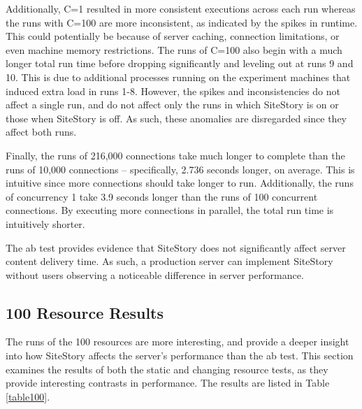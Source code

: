 \documentclass[runningheads,a4paper]{llncs}
\begin{document}
Additionally, C=1 resulted in more consistent executions across each run whereas the runs with C=100 are more inconsistent, as indicated by the spikes in runtime. This could potentially be because of server caching, connection limitations, or even machine memory restrictions. The runs of C=100 also begin with a much longer total run time before dropping significantly and leveling out at runs 9 and 10. 
This is due to additional processes running on the experiment machines that induced extra load in runs 1-8. However, the spikes and inconsistencies do not affect a single run, and do not affect only the runs in which SiteStory is on or those when SiteStory is off. As such, these anomalies are disregarded since they affect both runs.

Finally, the runs of 216,000 connections take much longer to complete than the runs of 10,000 connections -- specifically, 2.736 seconds longer, on average. This is intuitive since more connections should take longer to run. Additionally, the runs of concurrency 1 take 3.9 seconds longer than the runs of 100 concurrent connections. By executing more connections in parallel, the total run time is intuitively shorter. 

The ab test provides evidence that SiteStory does not significantly affect server content delivery time. As such, a production server can implement SiteStory without users observing a noticeable difference in server performance. 

\subsection{100 Resource Results}
\label{staticresults}
\vskip -3mm
The runs of the 100 resources are more interesting, and provide a deeper insight into how SiteStory affects the server's performance than the ab test. This section examines the results of both the static and changing resource tests, as they provide interesting contrasts in performance. The results are listed in Table \ref{table100}.

\end{document}
